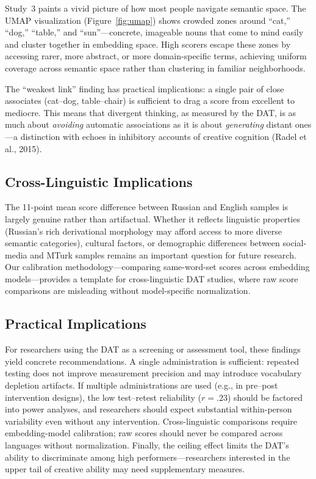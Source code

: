 \documentclass[12pt]{article}
\begin{document}
Study~3 paints a vivid picture of how most people navigate semantic space. The UMAP visualization (Figure~\ref{fig:umap}) shows crowded zones around ``cat,'' ``dog,'' ``table,'' and ``sun''---concrete, imageable nouns that come to mind easily and cluster together in embedding space. High scorers escape these zones by accessing rarer, more abstract, or more domain-specific terms, achieving uniform coverage across semantic space rather than clustering in familiar neighborhoods.

The ``weakest link'' finding has practical implications: a single pair of close associates (cat--dog, table--chair) is sufficient to drag a score from excellent to mediocre. This means that divergent thinking, as measured by the DAT, is as much about \textit{avoiding} automatic associations as it is about \textit{generating} distant ones---a distinction with echoes in inhibitory accounts of creative cognition (Radel et al., 2015).

\subsection{Cross-Linguistic Implications}

The 11-point mean score difference between Russian and English samples is largely genuine rather than artifactual. Whether it reflects linguistic properties (Russian's rich derivational morphology may afford access to more diverse semantic categories), cultural factors, or demographic differences between social-media and MTurk samples remains an important question for future research. Our calibration methodology---comparing same-word-set scores across embedding models---provides a template for cross-linguistic DAT studies, where raw score comparisons are misleading without model-specific normalization.

\subsection{Practical Implications}

For researchers using the DAT as a screening or assessment tool, these findings yield concrete recommendations. A single administration is sufficient: repeated testing does not improve measurement precision and may introduce vocabulary depletion artifacts. If multiple administrations are used (e.g., in pre--post intervention designs), the low test--retest reliability ($r = .23$) should be factored into power analyses, and researchers should expect substantial within-person variability even without any intervention. Cross-linguistic comparisons require embedding-model calibration; raw scores should never be compared across languages without normalization. Finally, the ceiling effect limits the DAT's ability to discriminate among high performers---researchers interested in the upper tail of creative ability may need supplementary measures.
\end{document}
